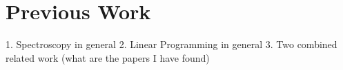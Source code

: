 \section{Previous Work}

1. Spectroscopy in general
2. Linear Programming in general
3. Two combined related work (what are the papers I have found)


